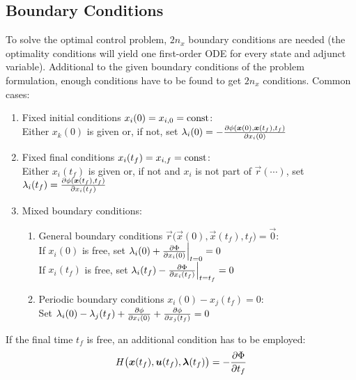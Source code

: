 		\subsection{Boundary Conditions}
			\label{subsec:boundary}

			To solve the optimal control problem, \(2n_x\) boundary conditions are needed (the optimality conditions will yield one first-order ODE for every state and adjunct variable). Additional to the given boundary conditions of the problem formulation, enough conditions have to be found to get \(2n_x\) conditions. Common cases:
			\begin{enumerate}[label = (\roman*)]
				\item Fixed initial conditions \( x_i(0) = x_{i, 0} = \operatorname{const} \): \\
					Either \( x_k(0) \) is given or, if not, set \( \lambda_i(0) = -\pdv{\phi(\bm{x}(0), \bm{x}(t_f), t_f)}{x_i(0)} \)
				\item Fixed final conditions \( x_i(t_f) = x_{i, f} = \operatorname{const} \): \\
					Either \( x_i(t_f) \) is given or, if not and \(x_i\) is not part of \( \vec{r}(\cdots) \), set \( \lambda_i(t_f) = \pdv{\phi(\bm{x}(t_f), t_f)}{x_i(t_f)} \)
				\item Mixed boundary conditions:
					\begin{enumerate}
						\item General boundary conditions \( \vec{r}\big(\vec{x}(0), \vec{x}(t_f), t_f\big) = \vec{0} \): \\
							If \( x_i(0) \) is free, set \( \lambda_i(0) + \pdv{\Phi}{x_i(0)} \Big\vert_{t = 0} = 0 \) \\
							If \( x_i(t_f) \) is free, set \( \lambda_i(t_f) - \pdv{\Phi}{x_i(t_f)} \Big\vert_{t = t_f} = 0 \)
						\item Periodic boundary conditions \( x_i(0) - x_j(t_f) = 0 \): \\
							Set \( \lambda_i(0) - \lambda_j(t_f) + \pdv{\phi}{x_i(0)} + \pdv{\phi}{x_j(t_f)} = 0 \)
					\end{enumerate}
			\end{enumerate}
			If the final time \(t_f\) is free, an additional condition has to be employed:
			\begin{align*}
				H\big(\bm{x}(t_f), \bm{u}(t_f), \bm{\lambda}(t_f)\big) = -\pdv{\Phi}{t_f}
			\end{align*}

